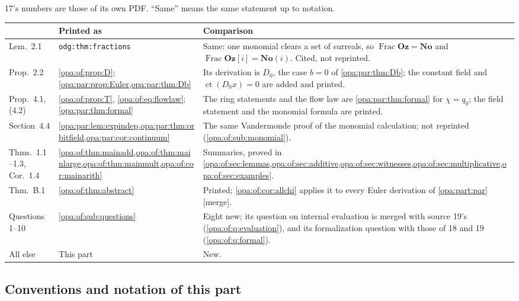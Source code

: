 \documentclass[11pt,oneside]{article}
\numberwithin{equation}{section}
\theoremstyle{definition}
\theoremstyle{remark}
\newcommand{\No}{\mathbf{No}}
\newcommand{\Oz}{\mathbf{Oz}}
\newcommand{\Og}{\mathbf{Oz}[i]}
\newcommand{\SC}{\mathbf{No}(i)}
\newcommand{\ct}{\operatorname{ct}}
\newcommand{\Frac}{\operatorname{Frac}}
\newcommand{\mergetag}{\textup{\textsf{\small[merge]}}}
\newcommand{\lbl}[1]{\nolinkurl{#1}}
\begin{document}
17's numbers are those of its own PDF. ``Same'' means the same statement up to notation.

\begin{center}
\renewcommand{\arraystretch}{1.15}
\begin{longtable}{>{\raggedright\arraybackslash}p{}>{\raggedright\arraybackslash}p{}>{\raggedright\arraybackslash}p{}}
\toprule
17 & Printed as & Comparison\\
\midrule
\endhead
Lem.~2.1 & \lbl{odg:thm:fractions} & Same: one monomial clears a set of surreals, so $\Frac\Oz=\No$ and
$\Frac\Og=\SC$. Cited, not reprinted.\\
Prop.~2.2 & \cref{opa:of:prop:D}; \cref{opa:par:prop:Euler,opa:par:thm:Db} & Its derivation is $D_0$, the case $b=0$
of \cref{opa:par:thm:Db}; the constant field and $\ct(D_0x)=0$ are added and printed.\\
Prop.~4.1, (4.2) & \cref{opa:of:prop:T}, \eqref{opa:of:eq:flowlaw}; \cref{opa:par:thm:formal} & The ring statements and
the flow law are \cref{opa:par:thm:formal} for $\chi=q_0$; the field statement and the monomial formula are printed.\\
Section~4.4 & \cref{opa:par:lem:expindep,opa:par:thm:orbitfield,opa:par:cor:continuum} & The same Vandermonde proof of
the monomial calculation; not reprinted (\cref{opa:of:sub:monomial}).\\
Thms.~1.1--1.3, Cor.~1.4 & \cref{opa:of:thm:mainadd,opa:of:thm:mainlarge,opa:of:thm:mainmult,opa:of:cor:mainarith} &
Summaries, proved in \cref{opa:of:sec:lemmas,opa:of:sec:additive,opa:of:sec:witnesses,opa:of:sec:multiplicative,opa:of:sec:examples}.\\
Thm.~B.1 & \cref{opa:of:thm:abstract} & Printed; \cref{opa:of:cor:allchi} applies it to every Euler derivation of
\cref{opa:part:par} \mergetag.\\
Questions~1--10 & \cref{opa:of:sub:questions} & Eight new; its question on internal evaluation is merged with
source 19's (\cref{opa:of:q:evaluation}), and its formalization question with those of 18 and 19
(\cref{opa:of:q:formal}).\\
All else & This part & New.\\
\bottomrule
\end{longtable}
\end{center}

\subsection{Conventions and notation of this part}\label{opa:of:sub:notation}
\end{document}
